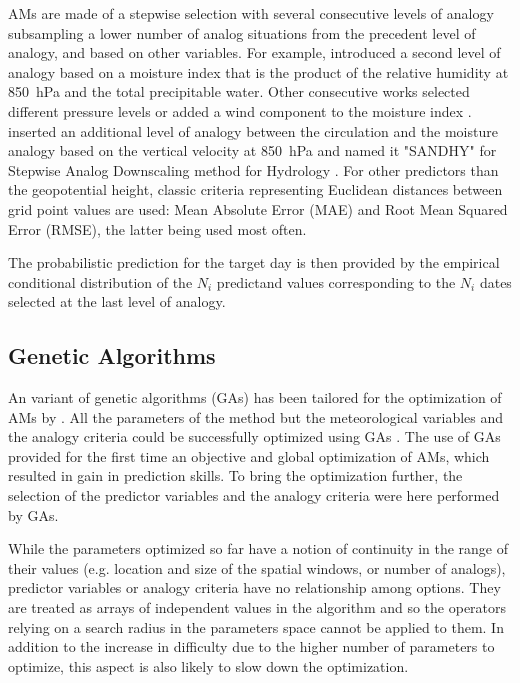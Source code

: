 \documentclass[draft]{agujournal2019}
\begin{document}
AMs are made of a stepwise selection with several consecutive levels of analogy subsampling a lower number of analog situations from the precedent level of analogy, and based on other variables. For example,  introduced a second level of analogy based on a moisture index that is the product of the relative humidity at 850~hPa and the total precipitable water. Other consecutive works selected different pressure levels or added a wind component to the moisture index \cite{Marty2010, Horton2018a}.  inserted an additional level of analogy between the circulation and the moisture analogy based on the vertical velocity at 850~hPa and named it "SANDHY" for Stepwise Analog Downscaling method for Hydrology \cite{BenDaoud2016, Caillouet2016}. For other predictors than the geopotential height, classic criteria representing Euclidean distances between grid point values are used: Mean Absolute Error (MAE) and Root Mean Squared Error (RMSE), the latter being used most often.

The probabilistic prediction for the target day is then provided by the empirical conditional distribution of the $N_{i}$ predictand values corresponding to the $N_{i}$ dates selected at the last level of analogy.


\subsection{Genetic Algorithms}

An variant of genetic algorithms (GAs) has been tailored for the optimization of AMs by . All the parameters of the method but the meteorological variables and the analogy criteria could be successfully optimized using GAs \cite{Horton2018a}. The use of GAs provided for the first time an objective and global optimization of AMs, which resulted in gain in prediction skills. To bring the optimization further, the selection of the predictor variables and the analogy criteria were here performed by GAs. 

While the parameters optimized so far have a notion of continuity in the range of their values (e.g. location and size of the spatial windows, or number of analogs), predictor variables or analogy criteria have no relationship among options. They are treated as arrays of independent values in the algorithm and so the operators relying on a search radius in the parameters space \cite{Horton2017a} cannot be applied to them. In addition to the increase in difficulty due to the higher number of parameters to optimize, this aspect is also likely to slow down the optimization.
\end{document}
